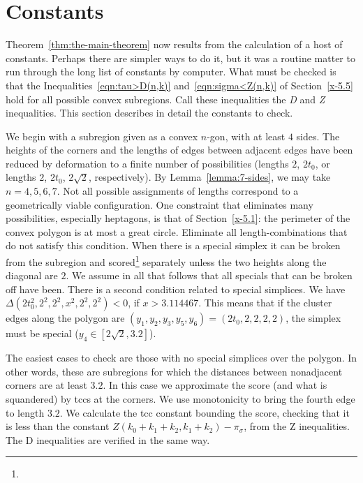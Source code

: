\section{Constants}

Theorem~\ref{thm:the-main-theorem} now results from the calculation of a
host of constants. Perhaps there are simpler ways to do it, but it was a
routine matter to run through the long list of constants by computer.
What must be checked is that the Inequalities~\ref{eqn:tau>D(n,k)}
and~\ref{eqn:sigma<Z(n,k)} of Section~\ref{x-5.5} hold for all possible
convex subregions. Call these inequalities the {\it D} and {\it Z}
inequalities.  This section describes in detail the constants to check.

We begin with a subregion given as a convex $n$-gon, with at least $4$
sides.   The heights of the corners and the lengths of edges between
adjacent edges have been reduced by deformation to a finite number of
possibilities (lengths $2$, $2t_0$, or lengths $2$, $2t_0$, $2\sqrt{2}$,
respectively). By Lemma~\ref{lemma:7-sides}, we may take $n=4,5,6,7$.
Not all possible assignments of lengths correspond to a geometrically
viable configuration. One constraint that eliminates many possibilities,
especially heptagons, is that of Section~\ref{x-5.1}: the perimeter of
the convex polygon is at most a great circle.  Eliminate all
length-combinations that do not satisfy this condition.  When there is a
special simplex it can be broken
from the subregion and scored\footnote{} %
separately unless the two heights along the diagonal are $2$.
We assume in all that follows that all specials that can be
broken off have been. There is a second condition related to special
simplices.  We have
    $\Delta(2t_0^2,2^2,2^2,x^2,2^2,2^2)<0$, if $x> 3.114467$.
This means that if the cluster edges along the polygon are
$(y_1,y_2,y_3,y_5,y_6)= (2t_0,2,2,2,2)$, the simplex must be special
($y_4\in[2\sqrt{2},3.2]$).

The easiest cases to check are those with no special simplices over the
polygon.  In other words, these are subregions for which the distances
between nonadjacent corners are at least $3.2$.  In this case we
approximate the score (and what is squandered) by tccs at the corners.
We use monotonicity to bring the fourth edge to length $3.2$. We
calculate the tcc constant bounding the score, checking that it is less
than the constant
    $ Z(k_0+k_1+k_2,k_1+k_2) - \pi_\sigma$,
from the Z inequalities. The D inequalities  are verified in the same
way.

